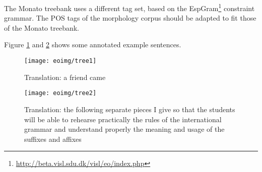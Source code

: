 \documentclass[10pt,a4paper]{article}
\begin{document}
The Monato treebank uses a different tag set, based on the 
EspGram\footnote{\url{http://beta.visl.sdu.dk/visl/eo/index.php}} constraint
grammar. The POS tags of the morphology corpus should be adapted to fit those
of the Monato treebank.

Figure \ref{s1} and \ref{s2} shows some annotated example sentences.


\begin{figure}
\centering
\texttt{[image: eoimg/tree1]}
\caption{Translation: a friend came}
\label{s1}
\end{figure}

\begin{comment}
\begin{verbatim}
(S (S (NP (DT la) (N' (JJ venontajn) (N' (JJ apartajn) (NN pecojn)))) 
(VP (NP (PRP mi)) (VP (VBP donas)))) (S' (IN ke) (S (NP (DT la) (NN lernantoj)) 
(VP (VB povu) (VP (VP (VP (VB ripeti) (RB praktike)) (NP (NP (DT la) (NN regulojn)) 
(PP (IN de) (NP (DT l') (N' (NN gramatiko) (JJ internacia)))))) 
(VPC (CC kaj) (VP (VP (VB kompreni) (RB bone)) (NP (NP (NP (DT la) (NN signifon)) 
(NPC (CC kaj) (NP (DT la) (NN uzon)))) (PP (IN de) 
(NP (DT l') (N' (NN sufiksoj) (NC (CC kaj) (NN prefiksoj)))))))))))))
\end{verbatim}
\end{comment}

\begin{figure}
\centering
\texttt{[image: eoimg/tree2]}
\caption{Translation: the following separate pieces I give so that the students
will be able to rehearse practically the rules of the international grammar and understand properly the meaning and usage of the suffixes and affixes}
\label{s2}
\end{figure}
\end{document}

